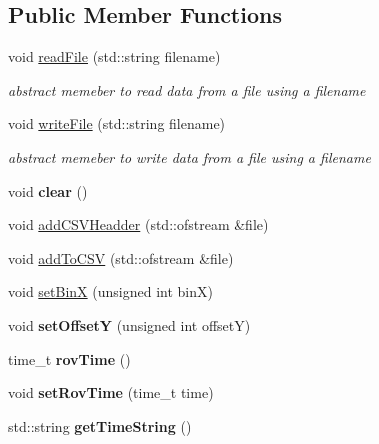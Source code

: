 \subsection*{Public Member Functions}
\begin{DoxyCompactItemize}
\item 
void \hyperlink{classLaserData_ae7d37ab61d0ee00538c33740ac0ad7ab}{read\+File} (std\+::string filename)
\begin{DoxyCompactList}\small\item\em abstract memeber to read data from a file using a filename \end{DoxyCompactList}\item 
void \hyperlink{classLaserData_abef00b09c8ee06285c0683198de5a9e3}{write\+File} (std\+::string filename)
\begin{DoxyCompactList}\small\item\em abstract memeber to write data from a file using a filename \end{DoxyCompactList}\item 
void {\bfseries clear} ()\hypertarget{classLaserData_a6462ffa1c43147c6f8b86f1a2f0a88d5}{}\label{classLaserData_a6462ffa1c43147c6f8b86f1a2f0a88d5}

\item 
void \hyperlink{classLaserData_ab8e14af133eae966b6052cbd09a08109}{add\+C\+S\+V\+Headder} (std\+::ofstream \&file)
\item 
void \hyperlink{classLaserData_aea796bd61748189ccf1941389951935c}{add\+To\+C\+SV} (std\+::ofstream \&file)
\item 
void \hyperlink{classLaserData_ae206ddd7509d1120b189b7909f3868f1}{set\+BinX} (unsigned int binX)
\item 
void {\bfseries set\+OffsetY} (unsigned int offsetY)\hypertarget{classLaserData_a1c11124b5c9eacf10a7d55277338698c}{}\label{classLaserData_a1c11124b5c9eacf10a7d55277338698c}

\item 
time\+\_\+t {\bfseries rov\+Time} ()\hypertarget{classLaserData_a374a405b39ad33486f388e448dc2eeab}{}\label{classLaserData_a374a405b39ad33486f388e448dc2eeab}

\item 
void {\bfseries set\+Rov\+Time} (time\+\_\+t time)\hypertarget{classLaserData_aa92b06f057772ac6f47464406f43350d}{}\label{classLaserData_aa92b06f057772ac6f47464406f43350d}

\item 
std\+::string {\bfseries get\+Time\+String} ()\hypertarget{classLaserData_adf7b36dbe23e70c04258fe6b6acde00b}{}\label{classLaserData_adf7b36dbe23e70c04258fe6b6acde00b}


\end{DoxyCompactItemize}

